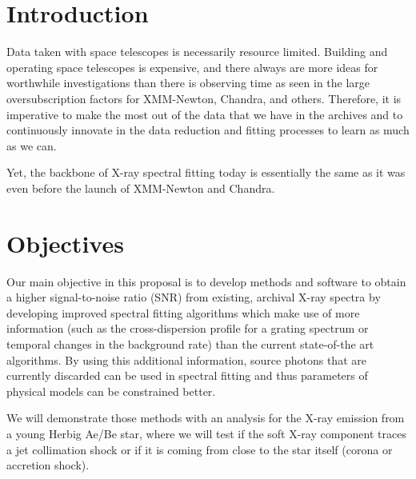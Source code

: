 \documentclass[fleqn,12pt,onecolumn]{SelfArx} %
\begin{document}
\flushbottom %

\maketitle %

\thispagestyle{empty} %

\setcounter{tocdepth}{1}
\tableofcontents



\section{Introduction}
Data taken with space telescopes is necessarily resource limited. Building and operating space telescopes is expensive, and there always are more ideas for worthwhile investigations than there is observing time as seen in the large oversubscription factors for XMM-Newton, Chandra, and others. Therefore, it is imperative to make the most out of the data that we have in the archives and to continuously innovate in the data reduction and fitting processes to learn as much as we can.

Yet, the backbone of X-ray spectral fitting today is essentially the same as it was even before the launch of XMM-Newton and Chandra.

\section{Objectives}
Our main objective in this proposal is to develop methods and software to obtain a higher signal-to-noise ratio (SNR) from existing, archival X-ray spectra by developing improved spectral fitting algorithms which make use of more information (such as the cross-dispersion profile for a grating spectrum or temporal changes in the background rate) than the current state-of-the art algorithms. By using this additional information, source photons that are currently discarded can be used in spectral fitting and thus parameters of physical models can be constrained better.

We will demonstrate those methods with an analysis for the X-ray emission from a young Herbig Ae/Be star, where we will test if the soft X-ray component traces a jet collimation shock or if it is coming from close to the star itself (corona or accretion shock).
\end{document}
